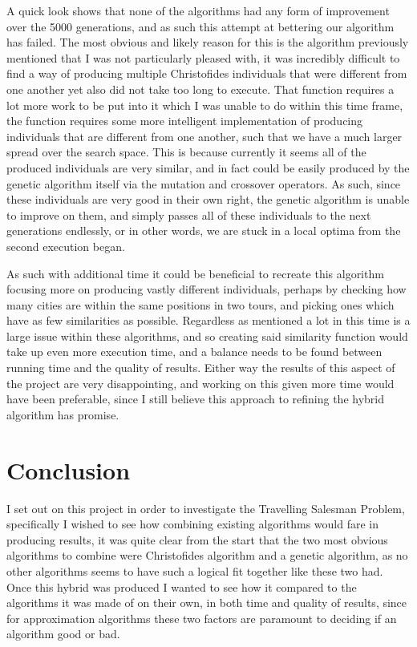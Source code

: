 \documentclass[11pt,a4paper,titlepage]{article}
\begin{document}
A quick look shows that none of the algorithms had any form of improvement over the 5000 generations, and as such this attempt at bettering our algorithm has failed. The most obvious and likely reason for this is the algorithm previously mentioned that I was not particularly pleased with, it was incredibly difficult to find a way of producing multiple Christofides individuals that were different from one another yet also did not take too long to execute. That function requires a lot more work to be put into it which I was unable to do within this time frame, the function requires some more intelligent implementation of producing individuals that are different from one another, such that we have a much larger spread over the search space. This is because currently it seems all of the produced individuals are very similar, and in fact could be easily produced by the genetic algorithm itself via the mutation and crossover operators. As such, since these individuals are very good in their own right, the genetic algorithm is unable to improve on them, and simply passes all of these individuals to the next generations endlessly, or in other words, we are stuck in a local optima from the second execution began.

As such with additional time it could be beneficial to recreate this algorithm focusing more on producing vastly different individuals, perhaps by checking how many cities are within the same positions in two tours, and picking ones which have as few similarities as possible. Regardless as mentioned a lot in this time is a large issue within these algorithms, and so creating said similarity function would take up even more execution time, and a balance needs to be found between running time and the quality of results. Either way the results of this aspect of the project are very disappointing, and working on this given more time would have been preferable, since I still believe this approach to refining the hybrid algorithm has promise.

\section{Conclusion}

I set out on this project in order to investigate the Travelling Salesman Problem, specifically I wished to see how combining existing algorithms would fare in producing results, it was quite clear from the start that the two most obvious algorithms to combine were Christofides algorithm and a genetic algorithm, as no other algorithms seems to have such a logical fit together like these two had. Once this hybrid was produced I wanted to see how it compared to the algorithms it was made of on their own, in both time and quality of results, since for approximation algorithms these two factors are paramount to deciding if an algorithm good or bad.
\end{document}
